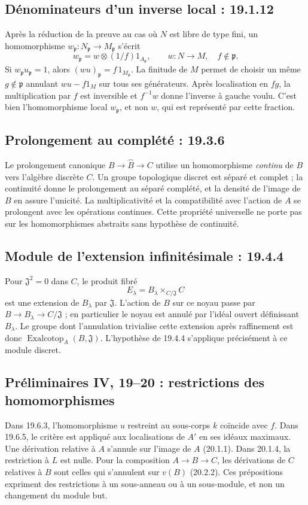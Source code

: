 \documentclass[11pt,a4paper]{article}
\begin{document}
\subsection{Dénominateurs d'un inverse local : 19.1.12}
\label{note:iv1-6}
Après la réduction de la preuve au cas où $N$ est libre de type fini,
un homomorphisme
$w_{\mathfrak p}:N_{\mathfrak p}\to M_{\mathfrak p}$ s'écrit
\[
 w_{\mathfrak p}=w\otimes(1/f)1_{A_{\mathfrak p}},
 \qquad w:N\to M,\quad f\notin\mathfrak p.
\]
Si $w_{\mathfrak p}u_{\mathfrak p}=1$, alors
$(wu)_{\mathfrak p}=f\,1_{M_{\mathfrak p}}$.
La finitude de $M$ permet de choisir un même $g\notin\mathfrak p$
annulant $wu-f1_M$ sur tous ses générateurs. Après localisation en
$fg$, la multiplication par $f$ est inversible et
$f^{-1}w$ donne l'inverse à gauche voulu. C'est bien l'homomorphisme
local $w_{\mathfrak p}$, et non $w$, qui est représenté par cette fraction.

\subsection{Prolongement au complété : 19.3.6}
\label{note:iv1-7}
Le prolongement canonique $B\to\widehat B\to C$ utilise un
homomorphisme \emph{continu} de $B$ vers l'algèbre discrète $C$.
Un groupe topologique discret est séparé et complet ; la continuité
donne le prolongement au séparé complété, et la densité de l'image de
$B$ en assure l'unicité. La multiplicativité et la compatibilité avec
l'action de $A$ se prolongent avec les opérations continues. Cette
propriété universelle ne porte pas sur les homomorphismes abstraits
sans hypothèse de continuité.

\subsection{Module de l'extension infinitésimale : 19.4.4}
\label{note:iv1-8}
Pour $\mathfrak J^2=0$ dans $C$, le produit fibré
\[
 E_\lambda=B_\lambda\mathbin{\times}_{C/\mathfrak J}C
\]
est une extension de $B_\lambda$ par $\mathfrak J$.
L'action de $B$ sur ce noyau passe par
$B\to B_\lambda\to C/\mathfrak J$ ; en particulier le noyau est
annulé par l'idéal ouvert définissant $B_\lambda$.
Le groupe dont l'annulation trivialise cette extension après
raffinement est donc
$\operatorname{Exalcotop}_A(B,\mathfrak J)$.
L'hypothèse de 19.4.4 s'applique précisément à ce module discret.

\subsection{Préliminaires IV, 19--20 : restrictions des homomorphismes}
\label{note:iv1-domains}
Dans 19.6.3, l'homomorphisme $u$ restreint au sous-corps $k$
coïncide avec $f$. Dans 19.6.5, le critère est appliqué aux
localisations de $A'$ en ses idéaux maximaux.
Une dérivation relative à $A$ s'annule sur l'image de $A$
(20.1.1). Dans 20.1.4, la restriction à $L$ est nulle.
Pour la composition $A\to B\to C$, les dérivations de $C$
relatives à $B$ sont celles qui s'annulent sur $v(B)$ (20.2.2).
Ces prépositions expriment des restrictions à un sous-anneau
ou à un sous-module, et non un changement du module but.
\par
\end{document}
